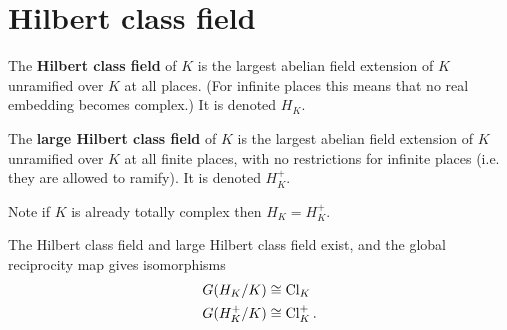 \section{Hilbert class field}
\begin{df}
The \textbf{Hilbert class field} of $K$ is the largest abelian field extension of $K$ unramified over $K$ at all places. (For infinite places this means that no real embedding becomes complex.) It is denoted $H_K$.

The \textbf{large Hilbert class field} of $K$ is the largest abelian field extension of $K$ unramified over $K$ at all finite places, with no restrictions for infinite places (i.e. they are allowed to ramify). It is denoted $H_K^+$.
\end{df}
Note if $K$ is already totally complex then $H_K=H_K^+$.
\begin{pr}
The Hilbert class field and large Hilbert class field exist, and the global reciprocity map gives isomorphisms
\begin{align*}
G(H_K/K)&\cong \operatorname{Cl}_K\\
G(H_K^+/K)&\cong \operatorname{Cl}_K^+.
\end{align*}
\end{pr}
